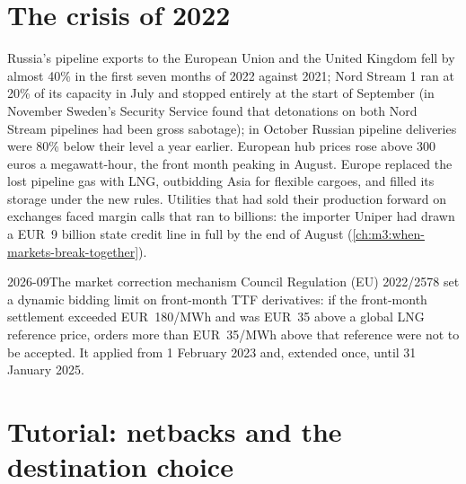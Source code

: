 \section{The crisis of 2022}

Russia's pipeline exports to the European Union and the United Kingdom fell by almost
40\% in the first seven months of 2022 against 2021; Nord Stream 1 ran at 20\% of its
capacity in July and stopped entirely at the start of September (in November Sweden's Security Service
found that detonations on both Nord Stream pipelines had been gross sabotage); in October Russian
pipeline deliveries were 80\% below their level a year earlier. European hub prices rose above 300 euros a megawatt-hour, the front month peaking in August.
Europe replaced the lost pipeline gas with LNG, outbidding Asia for flexible cargoes,
and filled its storage under the new rules. Utilities that had sold their production
forward on exchanges faced margin calls that ran to billions: the importer Uniper had drawn a EUR~9 billion state
credit line in full by the end of August (\cref{ch:m3:when-markets-break-together}).

\begin{dated}{2026-09}{The market correction mechanism}\label{dat:m3:natural-gas-and-lng:mcm}
Council Regulation (EU) 2022/2578 set a dynamic bidding limit on front-month TTF
derivatives: if the front-month settlement exceeded EUR~180/MWh and was EUR~35 above a
global LNG reference price, orders more than EUR~35/MWh above that reference were not
to be accepted. It applied from 1 February 2023 and, extended once, until 31 January 2025.
\end{dated}

\section{Tutorial: netbacks and the destination choice}\label{tut:m3:natural-gas-and-lng:netback}

